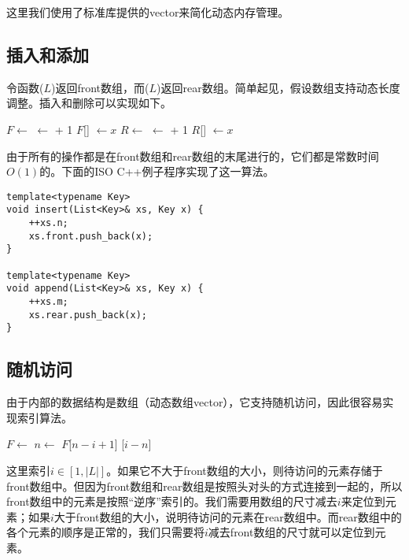 \documentclass[UTF8]{article}
\begin{document}
这里我们使用了标准库提供的vector来简化动态内存管理。

\subsection{插入和添加}
令函数($L$)返回front数组，而($L$)返回rear数组。简单起见，假设数组支持动态长度调整。插入和删除可以实现如下。

\begin{algorithmic}
  \State $F \gets $ 
  \State {} $\gets $  + 1
  \State $F$[] $\gets x$
\EndFunction
\Statex
{}
  \State $R \gets $ 
  \State {} $\gets $  + 1
  \State $R$[] $\gets x$
\EndFunction
\end{algorithmic}

由于所有的操作都是在front数组和rear数组的末尾进行的，它们都是常数时间$O(1)$的。下面的ISO C++例子程序实现了这一算法。

\begin{lstlisting}
template<typename Key>
void insert(List<Key>& xs, Key x) {
    ++xs.n;
    xs.front.push_back(x);
}

template<typename Key>
void append(List<Key>& xs, Key x) {
    ++xs.m;
    xs.rear.push_back(x);
}
\end{lstlisting}

\subsection{随机访问}
由于内部的数据结构是数组（动态数组vector），它支持随机访问，因此很容易实现索引算法。

\begin{algorithmic}
  \State $F \gets $ 
  \State $n \gets $ 
    \State \Return $F$[$n-i+1$]
  \Else
    \State \Return {}[$i-n$]
  \EndIf
\EndFunction
\end{algorithmic}

这里索引$i \in [1, |L|]$。如果它不大于front数组的大小，则待访问的元素存储于front数组中。但因为front数组和rear数组是按照头对头的方式连接到一起的，所以front数组中的元素是按照“逆序”索引的。我们需要用数组的尺寸减去$i$来定位到元素；如果$i$大于front数组的大小，说明待访问的元素在rear数组中。而rear数组中的各个元素的顺序是正常的，我们只需要将$i$减去front数组的尺寸就可以定位到元素。
\end{document}
